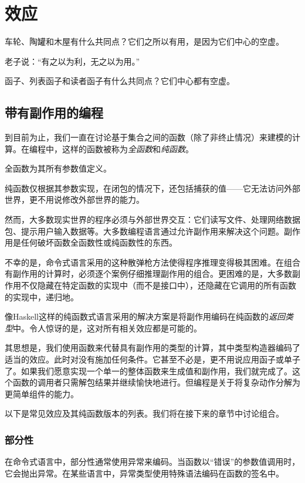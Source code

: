 \documentclass[DaoFP]{subfiles}
\begin{document}
\setcounter{chapter}{12}

\chapter{效应}

车轮、陶罐和木屋有什么共同点？它们之所以有用，是因为它们中心的空虚。

老子说：“有之以为利，无之以为用。”

函子、列表函子和读者函子有什么共同点？它们中心都有空虚。

\section{带有副作用的编程}

到目前为止，我们一直在讨论基于集合之间的函数（除了非终止情况）来建模的计算。在编程中，这样的函数被称为\emph{全函数}和\emph{纯函数}。

全函数为其所有参数值定义。

纯函数仅根据其参数实现，在闭包的情况下，还包括捕获的值——它无法访问外部世界，更不用说修改外部世界的能力。

然而，大多数现实世界的程序必须与外部世界交互：它们读写文件、处理网络数据包、提示用户输入数据等。大多数编程语言通过允许副作用来解决这个问题。副作用是任何破坏函数全函数性或纯函数性的东西。

不幸的是，命令式语言采用的这种散弹枪方法使得程序推理变得极其困难。在组合有副作用的计算时，必须逐个案例仔细推理副作用的组合。更困难的是，大多数副作用不仅隐藏在特定函数的实现中（而不是接口中），还隐藏在它调用的所有函数的实现中，递归地。

像Haskell这样的纯函数式语言采用的解决方案是将副作用编码在纯函数的\emph{返回类型}中。令人惊讶的是，这对所有相关效应都是可能的。

其思想是，我们使用函数来代替具有副作用的类型的计算，其中类型构造器编码了适当的效应。此时对没有施加任何条件。它甚至不必是，更不用说应用函子或单子了。如果我们愿意实现一个单一的整体函数来生成值和副作用，我们就完成了。这个函数的调用者只需解包结果并继续愉快地进行。但编程是关于将复杂动作分解为更简单组件的能力。

以下是常见效应及其纯函数版本的列表。我们将在接下来的章节中讨论组合。

\subsection{部分性}
在命令式语言中，部分性通常使用异常来编码。当函数以“错误”的参数值调用时，它会抛出异常。在某些语言中，异常类型使用特殊语法编码在函数的签名中。
\end{document}
